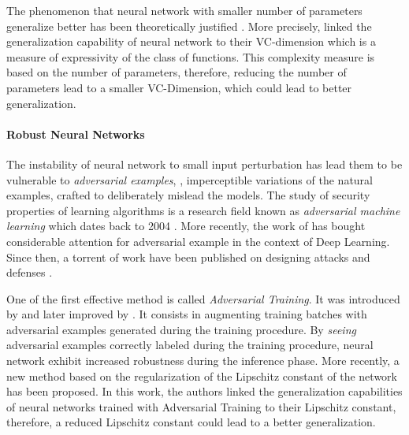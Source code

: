 The phenomenon that neural network with smaller number of parameters generalize better has been theoretically justified \cite{vapnik1982estimation}.
More precisely, \citeauthor{vapnik1982estimation} linked the generalization capability of neural network to their VC-dimension which is a measure of expressivity of the class of functions.
This complexity measure is based on the number of parameters, therefore, reducing the number of parameters lead to a smaller VC-Dimension, which could lead to better generalization.



\paragraph{Robust Neural Networks}

The instability of neural network to small input perturbation has lead them to be vulnerable to \emph{adversarial examples}, \ie, imperceptible variations of the natural examples, crafted to deliberately mislead the models.
The study of security properties of learning algorithms is a research field known as \emph{adversarial machine learning} which dates back to 2004 \cite{dalvi2004adversarial}.
More recently, the work of \citet{Szegedy2013IntriguingPO} has bought considerable attention for adversarial example in the context of Deep Learning. Since then, a torrent of work have been published on designing attacks and defenses \cite{Szegedy2013IntriguingPO,goodfellow2014explaining,papernot2016limitations,madry2018towards,carlini2017towards,pinot2019theoretical}.

One of the first effective method is called \emph{Adversarial Training}.
It was introduced by \citet{goodfellow2014explaining} and later improved by \citet{madry2018towards}.
It consists in augmenting training batches with adversarial examples generated during the training procedure.
By \emph{seeing} adversarial examples correctly labeled during the training procedure, neural network exhibit increased robustness during the inference phase.
More recently, a new method \cite{farnia2018generalizable} based on the regularization of the Lipschitz constant of the network has been proposed.
In this work, the authors linked the generalization capabilities of neural networks trained with Adversarial Training to their Lipschitz constant, therefore, a reduced Lipschitz constant could lead to a better generalization.







